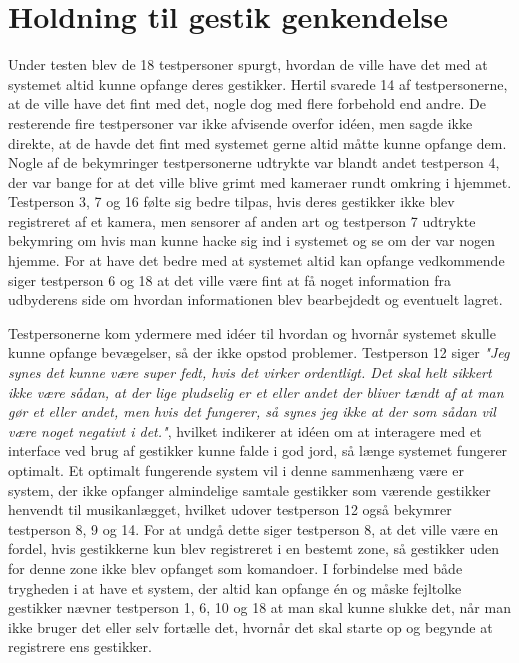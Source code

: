 \section{Holdning til gestik genkendelse}
\label{TestresultaterOvervaagning}
%
Under testen blev de 18 testpersoner spurgt, hvordan de ville have det med at systemet altid kunne opfange deres gestikker. Hertil svarede 14 af testpersonerne, at de ville have det fint med det, nogle dog med flere forbehold end andre. De resterende fire testpersoner var ikke afvisende overfor idéen, men sagde ikke direkte, at de havde det fint med systemet gerne altid måtte kunne opfange dem. Nogle af de bekymringer testpersonerne udtrykte var blandt andet testperson 4, der var bange for at det ville blive grimt med kameraer rundt omkring i hjemmet. Testperson 3, 7 og 16 følte sig bedre tilpas, hvis deres gestikker ikke blev registreret af et kamera, men sensorer af anden art og testperson 7 udtrykte bekymring om hvis man kunne hacke sig ind i systemet og se om der var nogen hjemme. For at have det bedre med at systemet altid kan opfange vedkommende siger testperson 6 og 18 at det ville være fint at få noget information fra udbyderens side om hvordan informationen blev bearbejdedt og eventuelt lagret. 

Testpersonerne kom ydermere med idéer til hvordan og hvornår systemet skulle kunne opfange bevægelser, så der ikke opstod problemer. Testperson 12 siger \textsl{"Jeg synes det kunne være super fedt, hvis det virker ordentligt. Det skal helt sikkert ikke være sådan, at der lige pludselig er et eller andet der bliver tændt af at man gør et eller andet, men hvis det fungerer, så synes jeg ikke at der som sådan vil være noget negativt i det."}, hvilket indikerer at idéen om at interagere med et interface ved brug af gestikker kunne falde i god jord, så længe systemet fungerer optimalt. Et optimalt fungerende system vil i denne sammenhæng være er system, der ikke opfanger almindelige samtale gestikker som værende gestikker henvendt til musikanlægget, hvilket udover testperson 12 også bekymrer testperson 8, 9 og 14. For at undgå dette siger testperson 8, at det ville være en fordel, hvis gestikkerne kun blev registreret i en bestemt zone, så gestikker uden for denne zone ikke blev opfanget som komandoer. I forbindelse med både trygheden i at have et system, der altid kan opfange én og måske fejltolke gestikker nævner testperson 1, 6, 10 og 18 at man skal kunne slukke det, når man ikke bruger det eller selv fortælle det, hvornår det skal starte op og begynde at registrere ens gestikker. 

